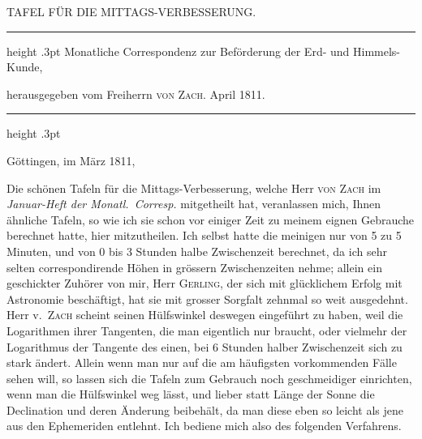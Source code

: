 \par\clearpage
\endgroup
\thispagestyle{empty}
%
\vspace*{2\baselineskip}
\begin{center}\large TAFEL FÜR DIE MITTAGS-VERBESSERUNG.\end{center}
\begin{center}\parbox{.78\linewidth}{\centering\fontsize{8.2}{10.2}\selectfont\frenchspacing
\hrule height .3pt\relax\vspace{2.5pt}
Monatliche Correspondenz zur Beförderung der Erd- und Himmels-Kunde,\par
herausgegeben vom Freiherrn \textsc{von Zach}. April 1811.\par
\vspace{2.5pt}\hrule height .3pt\relax
}\end{center}
\begin{flushright}Göttingen, im März 1811,\end{flushright}
\par\indent Die schönen Tafeln für die Mittags-Verbesserung, welche Herr \textsc{von Zach} im \emph{Januar-Heft der Monatl.\ Corresp.} mitgetheilt hat, veranlassen mich, Ihnen ähnliche Tafeln, so wie ich sie schon vor einiger Zeit zu meinem eignen Gebrauche berechnet hatte, hier mitzutheilen. Ich selbst hatte die meinigen nur von 5 zu 5 Minuten, und von 0 bis 3 Stunden halbe Zwischenzeit berechnet, da ich sehr selten correspondirende Höhen in grössern Zwischenzeiten nehme; allein ein geschickter Zuhörer von mir, Herr \textsc{Gerling}, der sich mit glücklichem Erfolg mit Astronomie beschäftigt, hat sie mit grosser Sorgfalt zehnmal so weit ausgedehnt. Herr v.\ \textsc{Zach} scheint seinen Hülfswinkel deswegen eingeführt zu haben, weil die Logarithmen ihrer Tangenten, die man eigentlich nur braucht, oder vielmehr der Logarithmus der Tangente des einen, bei 6 Stunden halber Zwischenzeit sich zu stark ändert. Allein wenn man nur auf die am häufigsten vorkommenden Fälle sehen will, so lassen sich die Tafeln zum Gebrauch noch geschmeidiger einrichten, wenn man die Hülfswinkel weg lässt, und lieber statt Länge der Sonne die Declination und deren Änderung beibehält, da man diese eben so leicht als jene aus den Ephemeriden entlehnt. Ich bediene mich also des folgenden Verfahrens.
\par\clearpage
\begingroup
\pagestyle{empty}
\newcommand{\GaussVIGathering}[2]{%
  \fancypagestyle{gaussVIGathering}{%
    \fancyhf{}%
    \renewcommand{\headrulewidth}{0pt}%
    \renewcommand{\footrulewidth}{0pt}%
    \fancyfoot[C]{\makebox[\textwidth][l]{%
      \hspace*{.025\textwidth}{\footnotesize\bfseries #1}\hfill
      {\normalsize\bfseries\textls[90]{#2}}\hspace*{.18\textwidth}}}%
  }%
  \thispagestyle{gaussVIGathering}%
}
